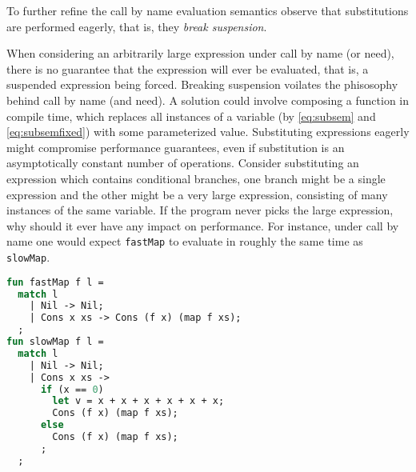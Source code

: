 \documentclass[11pt,oneside,a4paper]{report}
\begin{document}
To further refine the call by name evaluation semantics observe that substitutions are performed eagerly, that is, they \textit{break suspension}.
\begin{remark}
  When considering an arbitrarily large expression under call by name (or need), there is no guarantee that the expression will ever be evaluated, that is, a suspended expression being forced.
  Breaking suspension voilates the phisosophy behind call by name (and need).
  A solution could involve composing a function in compile time, which replaces all instances of a variable (by \autoref{eq:subsem} and \autoref{eq:subsemfixed}) with some parameterized value.
  Substituting expressions eagerly might compromise performance guarantees, even if substitution is an asymptotically constant number of operations.
  Consider substituting an expression which contains conditional branches, one branch might be a single expression and the other might be a very large expression, consisting of many instances of the same variable.
  If the program never picks the large expression, why should it ever have any impact on performance.
  For instance, under call by name one would expect \texttt{fastMap} to evaluate in roughly the same time as \texttt{slowMap}.
\begin{lstlisting}[language=ML,caption={Performance considerations in substitution},label={lst:problemprog},mathescape=true]
fun fastMap f l =
  match l
    | Nil -> Nil;
    | Cons x xs -> Cons (f x) (map f xs);
  ;
fun slowMap f l =
  match l
    | Nil -> Nil;
    | Cons x xs -> 
      if (x == 0)
        let v = x + x + x + x + x + x; 
        Cons (f x) (map f xs);
      else
        Cons (f x) (map f xs);
      ;
  ;
\end{lstlisting}
\end{remark}
\end{document}
